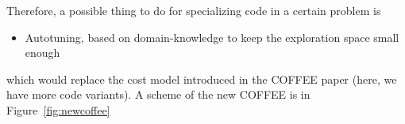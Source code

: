 \documentclass[a4paper]{article}
\begin{document}
\begin{itemize}
Therefore, a possible thing to do for specializing code in a certain problem is
\begin{itemize}
\item Autotuning, based on domain-knowledge to keep the exploration space small enough
\end{itemize}
which would replace the cost model introduced in the COFFEE paper (here, we have more code variants). A scheme of the new COFFEE is in Figure~\ref{fig:newcoffee}
\end{itemize}



%
%
\end{document}
